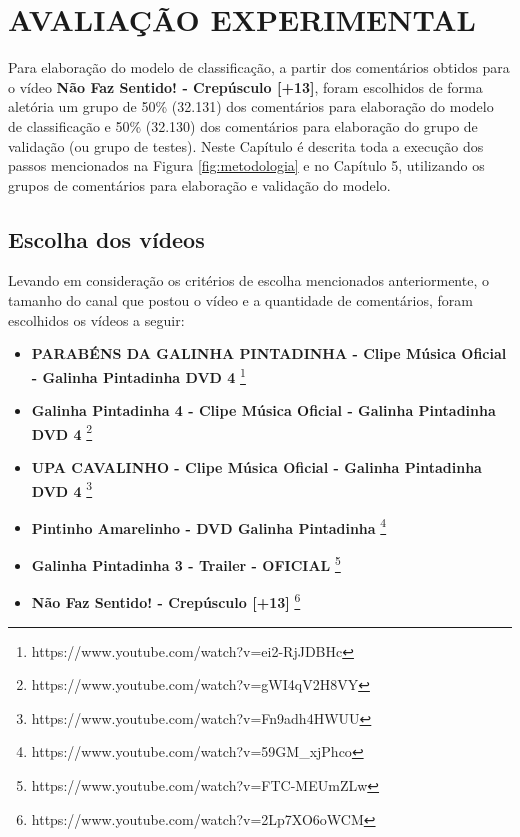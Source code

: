 \newpage
\section{AVALIAÇÃO EXPERIMENTAL}


Para elaboração do modelo de classificação, a partir dos comentários obtidos para o vídeo \textbf{Não Faz Sentido! - Crepúsculo [+13]}, foram escolhidos de forma aletória um grupo de 50\% (32.131) dos comentários para elaboração do modelo de classificação e 50\% (32.130) dos comentários para elaboração do grupo de validação (ou grupo de testes).
Neste Capítulo é descrita toda a execução dos passos mencionados na Figura \ref{fig:metodologia} e no Capítulo 5, utilizando os grupos de comentários para elaboração e validação do modelo.
\subsection{Escolha dos vídeos}
Levando em consideração os critérios de escolha mencionados anteriormente, o tamanho do canal que postou o vídeo e a quantidade de comentários, foram escolhidos os vídeos a seguir:

\begin{itemize}  
    \item \textbf{PARABÉNS DA GALINHA PINTADINHA - Clipe Música Oficial - Galinha Pintadinha DVD 4} \footnote{https://www.youtube.com/watch?v=ei2-RjJDBHc}
	\item \textbf{Galinha Pintadinha 4 - Clipe Música Oficial - Galinha Pintadinha DVD 4} \footnote{https://www.youtube.com/watch?v=gWI4qV2H8VY} 
	\item \textbf{UPA CAVALINHO - Clipe Música Oficial - Galinha Pintadinha DVD 4} \footnote{https://www.youtube.com/watch?v=Fn9adh4HWUU}
	\item \textbf{Pintinho Amarelinho - DVD Galinha Pintadinha} \footnote{https://www.youtube.com/watch?v=59GM\_xjPhco} 
	\item \textbf{Galinha Pintadinha 3 - Trailer - OFICIAL} \footnote{https://www.youtube.com/watch?v=FTC-MEUmZLw}
	\item \textbf{Não Faz Sentido! - Crepúsculo [+13]} \footnote{https://www.youtube.com/watch?v=2Lp7XO6oWCM} 
\end{itemize}


